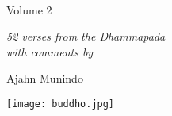 
\vspace*{1em}

{\centering

\\[0.4\baselineskip]
Volume 2
\vspace*{3\baselineskip}

{\itshape 52 verses from the Dhammapada\\
with comments by}

\vspace*{2\baselineskip}
Ajahn Munindo

\vfill

\texttt{[image: buddho.jpg]}
\vspace*{1.3em}


}

